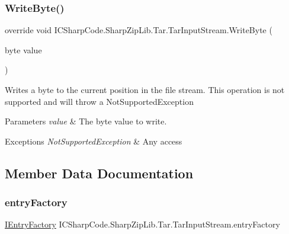 \subsubsection{\texorpdfstring{Write\+Byte()}{WriteByte()}}
{\footnotesize\ttfamily override void I\+C\+Sharp\+Code.\+Sharp\+Zip\+Lib.\+Tar.\+Tar\+Input\+Stream.\+Write\+Byte (\begin{DoxyParamCaption}\item[{byte}]{value }\end{DoxyParamCaption})\hspace{0.3cm}{\ttfamily [inline]}}



Writes a byte to the current position in the file stream. This operation is not supported and will throw a Not\+Supported\+Exception 


\begin{DoxyParams}{Parameters}
{\em value} & The byte value to write.\\
\hline
\end{DoxyParams}

\begin{DoxyExceptions}{Exceptions}
{\em Not\+Supported\+Exception} & Any access\\
\hline
\end{DoxyExceptions}


\subsection{Member Data Documentation}
\mbox{\label{class_i_c_sharp_code_1_1_sharp_zip_lib_1_1_tar_1_1_tar_input_stream_af4bb424ce3ff60281c217b17e8171b71}} 
\subsubsection{\texorpdfstring{entry\+Factory}{entryFactory}}
{\footnotesize\ttfamily \hyperlink{interface_i_c_sharp_code_1_1_sharp_zip_lib_1_1_tar_1_1_tar_input_stream_1_1_i_entry_factory}{I\+Entry\+Factory} I\+C\+Sharp\+Code.\+Sharp\+Zip\+Lib.\+Tar.\+Tar\+Input\+Stream.\+entry\+Factory\hspace{0.3cm}{\ttfamily [protected]}}



